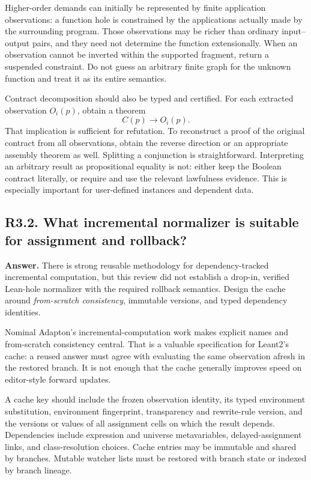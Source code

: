 \documentclass[11pt,a4paper]{article}
\newcommand{\code}[1]{\texttt{\detokenize{#1}}}
\newcommand{\question}[2]{\subsection{#1. #2}\label{q:#1}}
\theoremstyle{definition}
\theoremstyle{remark}
\begin{document}
Higher-order demands can initially be represented by finite application observations: a function hole is constrained by the applications actually made by the surrounding program. Those observations may be richer than ordinary input--output pairs, and they need not determine the function extensionally. When an observation cannot be inverted within the supported fragment, return a suspended constraint. Do not guess an arbitrary finite graph for the unknown function and treat it as its entire semantics.

Contract decomposition should also be typed and certified. For each extracted observation $O_i(p)$, obtain a theorem
\[
 C(p)\longrightarrow O_i(p).
\]
That implication is sufficient for refutation. To reconstruct a proof of the original contract from all observations, obtain the reverse direction or an appropriate assembly theorem as well. Splitting a conjunction is straightforward. Interpreting an arbitrary \code{BEq} result as propositional equality is not: either keep the Boolean contract literally, or require and use the relevant lawfulness evidence. This is especially important for user-defined instances and dependent data.

\question{R3.2}{What incremental normalizer is suitable for assignment and rollback?}

\textbf{Answer.} There is strong reusable methodology for dependency-tracked incremental computation, but this review did not establish a drop-in, verified Lean-hole normalizer with the required rollback semantics. Design the cache around \emph{from-scratch consistency}, immutable versions, and typed dependency identities.

Nominal Adapton's incremental-computation work makes explicit names and from-scratch consistency central.\cite{adapton} That is a valuable specification for Leant2's cache: a reused answer must agree with evaluating the same observation afresh in the restored branch. It is not enough that the cache generally improves speed on editor-style forward updates.

A cache key should include the frozen observation identity, its typed environment substitution, environment fingerprint, transparency and rewrite-rule version, and the versions or values of all assignment cells on which the result depends. Dependencies include expression and universe metavariables, delayed-assignment links, and class-resolution choices. Cache entries may be immutable and shared by branches. Mutable watcher lists must be restored with branch state or indexed by branch lineage.
\end{document}

